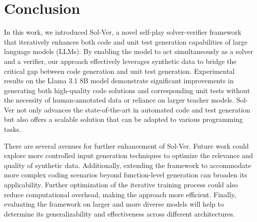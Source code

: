 \section{Conclusion}

In this work, we introduced {\sc Sol-Ver}, a novel self-play solver-verifier framework that iteratively enhances both code and unit test generation capabilities of large language models (LLMs). By enabling the model to act simultaneously as a solver and a verifier, our approach effectively leverages synthetic data to bridge the critical gap between code generation and unit test generation. Experimental results on the Llama 3.1 8B model demonstrate significant improvements in generating both high-quality code solutions and corresponding unit tests without the necessity of human-annotated data or reliance on larger teacher models. {\sc Sol-Ver} not only advances the state-of-the-art in automated code and test generation but also offers a scalable solution that can be adapted to various programming tasks.

There are several avenues for further enhancement of {\sc Sol-Ver}. Future work could explore more controlled input generation techniques to optimize the relevance and quality of synthetic data. Additionally, extending the framework to accommodate more complex coding scenarios beyond function-level generation can broaden its applicability.
Further optimization of the iterative training process could also reduce computational overhead, making the approach more efficient.
Finally, evaluating the framework on larger and more diverse models will help to determine its generalizability and effectiveness across different architectures.



